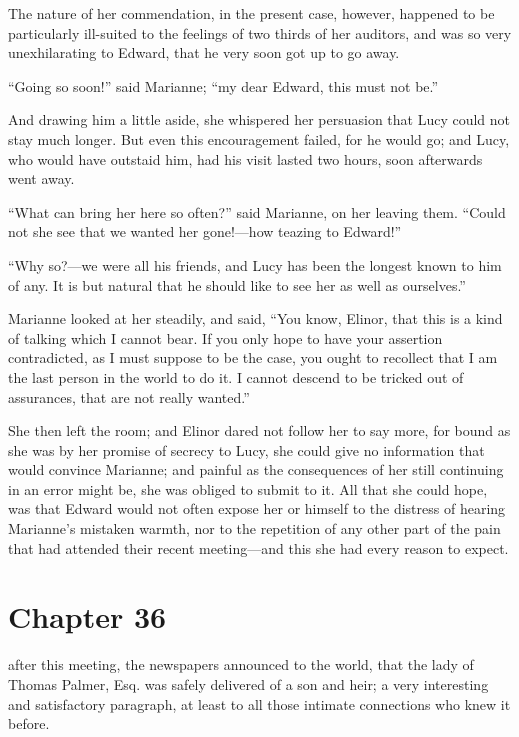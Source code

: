 The nature of her commendation, in the present case,
however, happened to be particularly ill-suited to the
feelings of two thirds of her auditors, and was so very
unexhilarating to Edward, that he very soon got up to go away.

``Going so soon!'' said Marianne; ``my dear Edward,
this must not be.''

And drawing him a little aside, she whispered
her persuasion that Lucy could not stay much longer.
But even this encouragement failed, for he would go;
and Lucy, who would have outstaid him, had his visit lasted
two hours, soon afterwards went away.

``What can bring her here so often?'' said Marianne,
on her leaving them.  ``Could not she see that we wanted
her gone!---how teazing to Edward!''

``Why so?---we were all his friends, and Lucy has been
the longest known to him of any.  It is but natural
that he should like to see her as well as ourselves.''

Marianne looked at her steadily, and said, ``You know,
Elinor, that this is a kind of talking which I cannot bear.
If you only hope to have your assertion contradicted,
as I must suppose to be the case, you ought to recollect
that I am the last person in the world to do it.
I cannot descend to be tricked out of assurances, that are
not really wanted.''

She then left the room; and Elinor dared not follow
her to say more, for bound as she was by her promise
of secrecy to Lucy, she could give no information that
would convince Marianne; and painful as the consequences
of her still continuing in an error might be, she was
obliged to submit to it.  All that she could hope, was
that Edward would not often expose her or himself to the
distress of hearing Marianne's mistaken warmth, nor to the
repetition of any other part of the pain that had attended
their recent meeting---and this she had every reason to expect.



\chapter{Chapter 36}


 after this meeting, the newspapers
announced to the world, that the lady of Thomas Palmer,
Esq. was safely delivered of a son and heir; a very
interesting and satisfactory paragraph, at least to all
those intimate connections who knew it before.

